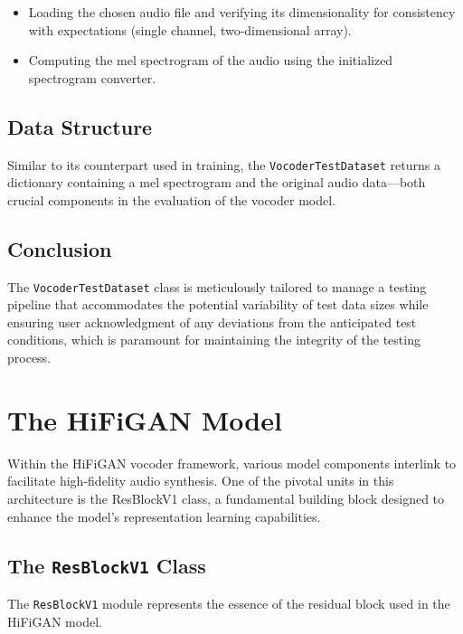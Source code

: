 \documentclass[a4paper]{article}
\begin{document}
\begin{itemize}
  \item Loading the chosen audio file and verifying its dimensionality for consistency with expectations (single channel, two-dimensional array).
  \item Computing the mel spectrogram of the audio using the initialized spectrogram converter.
\end{itemize}

\subsection{Data Structure}

Similar to its counterpart used in training, the \texttt{VocoderTestDataset} returns a dictionary containing a mel spectrogram and the original audio data—both crucial components in the evaluation of the vocoder model.

\subsection{Conclusion}

The \texttt{VocoderTestDataset} class is meticulously tailored to manage a testing pipeline that accommodates the potential variability of test data sizes while ensuring user acknowledgment of any deviations from the anticipated test conditions, which is paramount for maintaining the integrity of the testing process.



\section{The HiFiGAN Model}

Within the HiFiGAN vocoder framework, various model components interlink to facilitate high-fidelity audio synthesis. One of the pivotal units in this architecture is the ResBlockV1 class, a fundamental building block designed to enhance the model's representation learning capabilities.

\subsection{The \texttt{ResBlockV1} Class}

The \texttt{ResBlockV1} module represents the essence of the residual block used in the HiFiGAN model.
\end{document}

